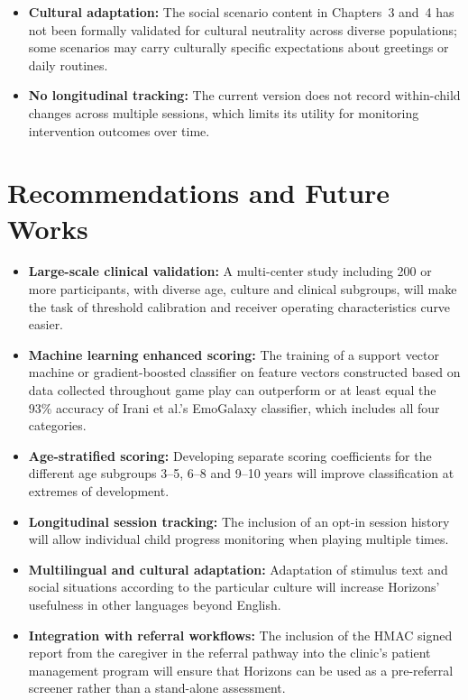 \documentclass[12pt,a4paper,oneside]{report}
\begin{document}
\begin{itemize}[leftmargin=0.5in]
  \item \textbf{Cultural adaptation:} The social scenario content in Chapters~3 and~4 has not been formally validated for cultural neutrality across diverse populations; some scenarios may carry culturally specific expectations about greetings or daily routines.

  \item \textbf{No longitudinal tracking:} The current version does not record within-child changes across multiple sessions, which limits its utility for monitoring intervention outcomes over time.
\end{itemize}

\section{Recommendations and Future Works}

\begin{itemize}[leftmargin=0.5in]
  \item \textbf{Large-scale clinical validation:} A multi-center study including 200 or more participants, with diverse age, culture and clinical subgroups, will make the task of threshold calibration and receiver operating characteristics curve easier.

  \item \textbf{Machine learning enhanced scoring:} The training of a support vector machine or gradient-boosted classifier on feature vectors constructed based on data collected throughout game play can outperform or at least equal the 93\% accuracy of Irani et al.'s EmoGalaxy classifier, which includes all four categories.

  \item \textbf{Age-stratified scoring:} Developing separate scoring coefficients for the different age subgroups 3–5, 6–8 and 9–10 years will improve classification at extremes of development.

  \item \textbf{Longitudinal session tracking:} The inclusion of an opt-in session history will allow individual child progress monitoring when playing multiple times.

  \item \textbf{Multilingual and cultural adaptation:} Adaptation of stimulus text and social situations according to the particular culture will increase Horizons' usefulness in other languages beyond English.

  \item \textbf{Integration with referral workflows:} The inclusion of the HMAC signed report from the caregiver in the referral pathway into the clinic's patient management program will ensure that Horizons can be used as a pre-referral screener rather than a stand-alone assessment.
\end{itemize}
\end{document}
